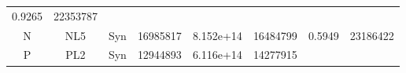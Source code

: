 \documentclass[]{article}
\begin{document}
\begin{longtable}[]{@{}cccccccc@{}}
\begin{minipage}[t]{0.08\columnwidth}
0.9265
\strut\end{minipage} &
\begin{minipage}[t]{0.12\columnwidth}\centering\strut
22353787
\strut\end{minipage}\tabularnewline
\begin{minipage}[t]{0.07\columnwidth}\centering\strut
N
\strut\end{minipage} &
\begin{minipage}[t]{0.07\columnwidth}\centering\strut
NL5
\strut\end{minipage} &
\begin{minipage}[t]{0.11\columnwidth}\centering\strut
Syn
\strut\end{minipage} &
\begin{minipage}[t]{0.11\columnwidth}\centering\strut
16985817
\strut\end{minipage} &
\begin{minipage}[t]{0.11\columnwidth}\centering\strut
8.152e+14
\strut\end{minipage} &
\begin{minipage}[t]{0.11\columnwidth}\centering\strut
16484799
\strut\end{minipage} &
\begin{minipage}[t]{0.08\columnwidth}\centering\strut
0.5949
\strut\end{minipage} &
\begin{minipage}[t]{0.12\columnwidth}\centering\strut
23186422
\strut\end{minipage}\tabularnewline
\begin{minipage}[t]{0.07\columnwidth}\centering\strut
P
\strut\end{minipage} &
\begin{minipage}[t]{0.07\columnwidth}\centering\strut
PL2
\strut\end{minipage} &
\begin{minipage}[t]{0.11\columnwidth}\centering\strut
Syn
\strut\end{minipage} &
\begin{minipage}[t]{0.11\columnwidth}\centering\strut
12944893
\strut\end{minipage} &
\begin{minipage}[t]{0.11\columnwidth}\centering\strut
6.116e+14
\strut\end{minipage} &
\begin{minipage}[t]{0.11\columnwidth}\centering\strut
14277915
\strut\end{minipage} &
\begin{minipage}[t]{0.08\columnwidth}\centering\strut

\end{minipage}
\end{longtable}
\end{document}

